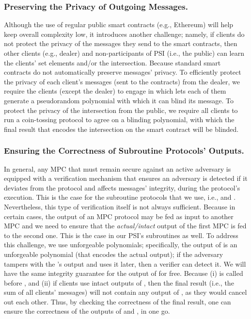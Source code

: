  \subsubsection{Preserving the Privacy of Outgoing Messages.} Although the use of regular public smart contracts (e.g., Ethereum) will help keep overall complexity low, it introduces another challenge; namely, if clients do not protect the privacy of the messages they send to the smart contracts, then other clients (e.g., dealer) and non-participants of PSI (i.e., the public) can learn the clients' set elements and/or the intersection. Because standard smart contracts do not automatically preserve messages' privacy. To efficiently protect the privacy of each client's messages (sent to the contracts) from the dealer, we require the clients (except the dealer) to engage in \zspaa which lets each of them generate a pseudorandom polynomial with which it can blind its message. To protect the privacy of the intersection from the public, we require all clients to run a coin-tossing protocol to agree on a blinding polynomial, with which the final result that encodes the intersection on the smart contract will be blinded.  
 
 
 \vs
 \vs
 
 \subsubsection{Ensuring the Correctness of Subroutine Protocols' Outputs.} 
 
 In general, any MPC that must remain secure against an active adversary is equipped with a verification mechanism that ensures an adversary is detected if it deviates from the protocol and affects messages' integrity, during the protocol's execution. This is the case for the subroutine protocols that we use, i.e., \vopr and \zspaa. Nevertheless, this type of verification itself is not always sufficient. Because in certain cases, the output of an MPC protocol may be fed as input to another MPC and we need to ensure that the \emph{actual/intact} output of the first MPC is fed to the second one. This is the case in our PSI's subroutines as well. To address this challenge, we use unforgeable polynomials; specifically, the output of \vopr is an unforgeable polynomial (that encodes the actual output); if the adversary tampers with the \vopr's output and uses it later, then a verifier can detect it. We will have the same integrity guarantee for the output of \zspaa for free. Because (i) \vopr is called before \zspaa, and (ii) if clients use intact outputs of \zspaa, then the final result (i.e., the sum of all clients' messages) will not contain any output of \zspaa, as they would cancel out each other. Thus, by checking the correctness of the final result, one can ensure the correctness of the outputs of \vopr and \zspaa, in one go. 
 
